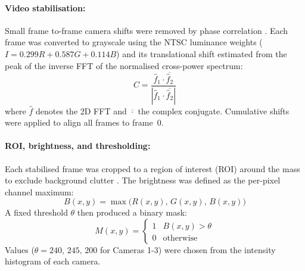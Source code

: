 \documentclass[12pt,a4paper]{article}
\begin{document}
\paragraph{Video stabilisation:}
Small frame to-frame camera shifts were removed by phase correlation \citep{kuglin1975}. Each frame was converted to grayscale using the NTSC luminance weights ($I = 0.299R + 0.587G + 0.114B$) \citep{gonzalez2018} and its translational shift estimated from the peak of the inverse FFT of the normalised cross-power spectrum:
{\small
\begin{equation}
    C = \frac{\hat{f}_1 \cdot \overline{\hat{f}_2}}{|\hat{f}_1 \cdot \overline{\hat{f}_2}|}
\end{equation}
} 
where $\hat{f}$ denotes the 2D FFT and $\overline{\cdot}$ the complex conjugate. Cumulative shifts were applied to align all frames to frame~0.

\paragraph{ROI, brightness, and thresholding:}
Each stabilised frame was cropped to a region of interest (ROI) around the mass to exclude background clutter \citep{gonzalez2018}. The brightness was defined as the per-pixel channel maximum:
{\small
\begin{equation}
    B(x,y) = \max\!\bigl(R(x,y),\, G(x,y),\, B(x,y)\bigr)
\end{equation}
}
A fixed threshold $\theta$ then produced a binary mask:
{\small
\begin{equation}
    M(x,y) = \begin{cases} 1 & B(x,y) > \theta \\ 0 & \text{otherwise} \end{cases}
\end{equation}
}
Values ($\theta = 240,\,245,\,200$ for Cameras 1-3) were chosen from the intensity histogram of each camera.
\end{document}
